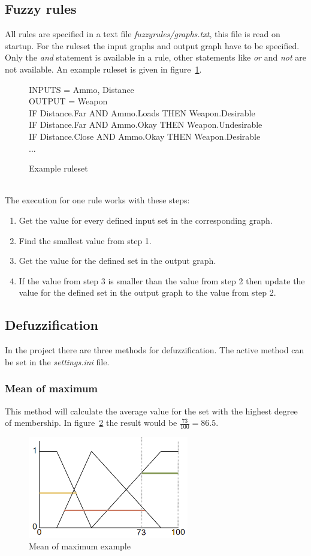 \documentclass[10pt]{extarticle} %
\begin{document}
   \subsection{Fuzzy rules}
   All rules are specified in a text file \emph{fuzzyrules/graphs.txt}, this file is read on startup. For the ruleset the input graphs and output graph have to be specified. Only the \emph{and} statement is available in a rule, other statements like \emph{or} and \emph{not} are not available. An example ruleset is given in figure~\ref{fig:ruleset}.
   \begin{figure}[h!]
   {\ttfamily 
   		INPUTS = Ammo, Distance\\
  	 	OUTPUT = Weapon\\
   		IF Distance.Far AND Ammo.Loads THEN Weapon.Desirable \\
   		IF Distance.Far AND Ammo.Okay THEN Weapon.Undesirable \\
   		IF Distance.Close AND Ammo.Okay THEN Weapon.Desirable \\
   		...
   }
   \caption{Example ruleset}
   \label{fig:ruleset}
   \end{figure}\\
   The execution for one rule works with these steps:
   \begin{enumerate}
   \item Get the value for every defined input set in the corresponding graph.
   \item Find the smallest value from step 1.
   \item Get the value for the defined set in the output graph.
   \item If the value from step 3 is smaller than the value from step 2 then update the value for the defined set in the output graph to the value from step 2.
   \end{enumerate}
   \subsection{Defuzzification}
   In the project there are three methods for defuzzification. The active method can be set in the \emph{settings.ini} file.   
   \subsubsection {Mean of maximum}  
   This method will calculate the average value for the set with the highest degree of membership. In figure~\ref{fig:MOM} the result would be \(\frac{73}{100}=86.5\). 
   \begin{figure}[h!]
   \begin{center}
   \includegraphics[width=7cm]{MOM.png}
   \end{center}
   \caption{Mean of maximum example}
   \label{fig:MOM}
   \end{figure}
\end{document}
